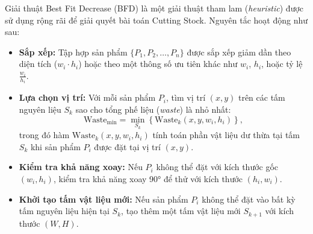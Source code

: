 \documentclass[a4paper]{article}
\begin{document}
\hspace{11pt}
Giải thuật Best Fit Decrease (BFD) là một giải thuật tham lam (\textit{heuristic}) được sử dụng rộng rãi để giải quyết bài toán Cutting Stock. Nguyên tắc hoạt động như sau:
\begin{itemize}
    \item \textbf{Sắp xếp:} Tập hợp sản phẩm \(\{P_1, P_2, \dots, P_n\}\) được sắp xếp giảm dần theo diện tích (\(w_i \cdot h_i\)) hoặc theo một thông số ưu tiên khác như \(w_i\), \(h_i\), hoặc tỷ lệ \(\frac{w_i}{h_i}\).

    \item \textbf{Lựa chọn vị trí:} Với mỗi sản phẩm \(P_i\), tìm vị trí \((x, y)\) trên các tấm nguyên liệu \(S_k\) sao cho tổng phế liệu (\textit{waste}) là nhỏ nhất:
    \[
    \text{Waste}_{\text{min}} = \min_{S_k} \left\{\text{Waste}_{k}(x, y, w_i, h_i)\right\},
    \]
    trong đó hàm \(\text{Waste}_{k}(x, y, w_i, h_i)\) tính toán phần vật liệu dư thừa tại tấm \(S_k\) khi sản phẩm \(P_i\) được đặt tại vị trí \((x, y)\).

    \item \textbf{Kiểm tra khả năng xoay:} Nếu \(P_i\) không thể đặt với kích thước gốc \((w_i, h_i)\), kiểm tra khả năng xoay 90° để thử với kích thước \((h_i, w_i)\).

    \item \textbf{Khởi tạo tấm vật liệu mới:} Nếu sản phẩm \(P_i\) không thể đặt vào bất kỳ tấm nguyên liệu hiện tại \(S_k\), tạo thêm một tấm vật liệu mới \(S_{k+1}\) với kích thước \((W, H)\).
\end{itemize}
\end{document}
